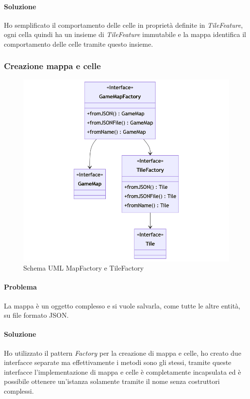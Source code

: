 \documentclass[a4paper,12pt]{report}
\begin{document}
\paragraph{Soluzione} Ho semplificato il comportamento delle celle in proprietà definite in \textit{TileFeature}, ogni
cella quindi ha un insieme di \textit{TileFeature} immutabile e la mappa identifica il comportamento delle celle tramite
questo insieme.

\subsubsection{Creazione mappa e celle}

\begin{figure}[H]
	\centering{}
	\includegraphics[width=\textwidth]{MapFactory}
	\caption{Schema UML MapFactory e TileFactory}
	\label{fig:MapFactory}
\end{figure}

\paragraph{Problema} La mappa è un oggetto complesso e si vuole salvarla, come tutte le altre entità, su file formato JSON.
\paragraph{Soluzione} Ho utilizzato il pattern \textit{Factory} per la creazione di mappa e celle, ho creato due interfacce
separate ma effettivamente i metodi sono gli stessi, tramite queste interfacce l'implementazione di mappa e celle è completamente
incapsulata ed è possibile ottenere un'istanza solamente tramite il nome senza costruttori complessi.
\end{document}
